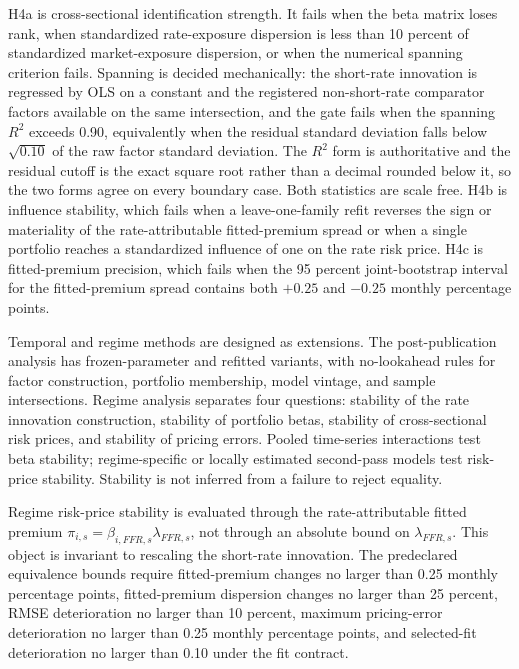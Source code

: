 \documentclass[11pt]{article}
\begin{document}
H4a is cross-sectional identification strength. It fails when the beta matrix
loses rank, when standardized rate-exposure dispersion is less than 10 percent %
of standardized market-exposure dispersion, or when the numerical spanning
criterion fails. Spanning is decided mechanically: the short-rate innovation is
regressed by OLS on a constant and the registered non-short-rate comparator
factors available on the same intersection, and the gate fails when the spanning
\(R^2\) exceeds 0.90, equivalently when the residual standard deviation falls %
below \(\sqrt{0.10}\) of the raw factor standard deviation. The \(R^2\) form is %
authoritative and the residual cutoff is the exact square root rather than a
decimal rounded below it, so the two forms agree on every boundary case. Both
statistics are scale
free. H4b is influence stability, which fails when a leave-one-family refit
reverses the sign or materiality of the rate-attributable fitted-premium spread
or when a single portfolio reaches a standardized influence of one on the rate
risk price. H4c is fitted-premium precision, which fails when the 95 percent %
joint-bootstrap interval for the fitted-premium spread contains both \(+0.25\) %
and \(-0.25\) monthly percentage points. %

Temporal and regime methods are designed as extensions. The post-publication
analysis has frozen-parameter and refitted variants, with no-lookahead rules for
factor construction, portfolio membership, model vintage, and sample
intersections. Regime analysis separates four questions: stability of the rate
innovation construction, stability of portfolio betas, stability of
cross-sectional risk prices, and stability of pricing errors. Pooled
time-series interactions test beta stability; regime-specific or locally
estimated second-pass models test risk-price stability. Stability is not
inferred from a failure to reject equality.

Regime risk-price stability is evaluated through the rate-attributable fitted
premium \(\pi_{i,s}=\beta_{i,FFR,s}\lambda_{FFR,s}\), not through an absolute
bound on \(\lambda_{FFR,s}\). This object is invariant to rescaling the
short-rate innovation. The predeclared equivalence bounds require fitted-premium
changes no larger than 0.25 monthly percentage points, fitted-premium dispersion %
changes no larger than 25 percent, RMSE deterioration no larger than 10 percent, %
maximum pricing-error deterioration no larger than 0.25 monthly percentage %
points, and selected-fit deterioration no larger than 0.10 under the fit %
contract. %
\end{document}
